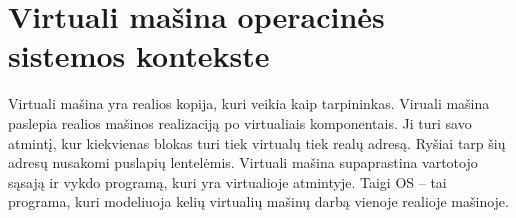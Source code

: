 \section{Virtuali mašina operacinės sistemos kontekste}

Virtuali mašina yra realios kopija, kuri veikia kaip tarpininkas. Viruali mašina paslepia realios mašinos realizaciją po virtualiais komponentais. Ji turi savo atmintį, kur kiekvienas blokas turi tiek virtualų tiek realų adresą. Ryšiai tarp šių adresų nusakomi puslapių lentelėmis. Virtuali mašina supaprastina vartotojo sąsają ir vykdo programą, kuri yra virtualioje atmintyje.
Taigi OS – tai programa, kuri modeliuoja kelių virtualių mašinų darbą vienoje realioje mašinoje.



